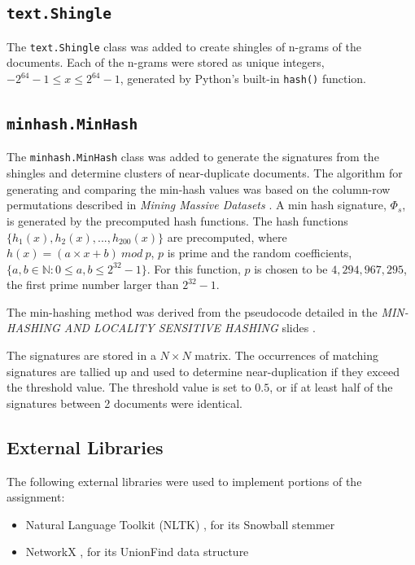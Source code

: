 \documentclass[11pt]{article}
\begin{document}
\subsection{\texttt{text.Shingle}}
The \texttt{text.Shingle} class was added to create shingles of n-grams of the documents. Each of the n-grams were stored as unique integers, $-2^{64}-1 \le x \le 2^{64}-1$, generated by Python's built-in \texttt{hash()} function.

\subsection{\texttt{minhash.MinHash}}
The \texttt{minhash.MinHash} class was added to generate the signatures from the shingles and determine clusters of near-duplicate documents. The algorithm for generating and comparing the min-hash values was based on the column-row permutations described in \textit{Mining Massive Datasets} \cite{leskovec_rajaraman_ullman_2022}. A min hash signature, $\Phi_s$, is generated by the precomputed hash functions. The hash functions $\{h_1(x),h_2(x),...,h_{200}(x)\}$ are precomputed, where $h(x)=(a \times x + b) \ mod \ p$, $p$ is prime and the random coefficients, $\{a,b \in \mathbb{N}: 0 \le a,b \le 2^{32}-1\}$. For this function, $p$ is chosen to be $4,294,967,295$, the first prime number larger than $2^{32}-1$.

The min-hashing method was derived from the pseudocode detailed in the \textit{MIN-HASHING AND LOCALITY SENSITIVE HASHING} slides \cite{kollios}.

The signatures are stored in a $N \times N$ matrix. The occurrences of matching signatures are tallied up and used to determine near-duplication if they exceed the threshold value. The threshold value is set to $0.5$, or if at least half of the signatures between 2 documents were identical.

\subsection{External Libraries}
The following external libraries were used to implement portions of the assignment:
\begin{itemize}
  \item Natural Language Toolkit (NLTK) \cite{bird2009natural}, for its Snowball stemmer
  \item NetworkX \cite{SciPyProceedings_11}, for its UnionFind data structure
\end{itemize}
\end{document}
